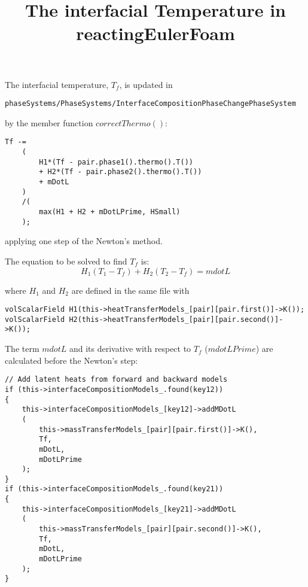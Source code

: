 \documentclass[]{report}
\title{The interfacial Temperature in reactingEulerFoam}
\author{}
\begin{document}
\maketitle

The interfacial temperature, $T_f$, is updated in
\begin{verbatim}
phaseSystems/PhaseSystems/InterfaceCompositionPhaseChangePhaseSystem
\end{verbatim}
by the member function $correctThermo()$:
\begin{verbatim}
Tf -=
	(
        H1*(Tf - pair.phase1().thermo().T())
        + H2*(Tf - pair.phase2().thermo().T())
        + mDotL
    )
    /(
        max(H1 + H2 + mDotLPrime, HSmall)
    );
\end{verbatim}
applying one step of the Newton's method.

The equation to be solved to find $T_f$ is:
\begin{equation}
H_1(T_1-T_f)+H_2(T_2-T_f)= mdotL
\end{equation}

where $H_1$ and $H_2$ are defined in the same file with
\begin{verbatim}
volScalarField H1(this->heatTransferModels_[pair][pair.first()]->K());
volScalarField H2(this->heatTransferModels_[pair][pair.second()]->K());
\end{verbatim}

The term $mdotL$ and its derivative with respect to $T_f$ ($mdotLPrime$) are calculated before the Newton's step:
\begin{verbatim}
// Add latent heats from forward and backward models
if (this->interfaceCompositionModels_.found(key12))
{
    this->interfaceCompositionModels_[key12]->addMDotL
    (
        this->massTransferModels_[pair][pair.first()]->K(),
        Tf,
        mDotL,
        mDotLPrime
    );
}
if (this->interfaceCompositionModels_.found(key21))
{
    this->interfaceCompositionModels_[key21]->addMDotL
    (
        this->massTransferModels_[pair][pair.second()]->K(),
        Tf,
        mDotL, 
        mDotLPrime
    );
}
\end{verbatim}
\end{document}
